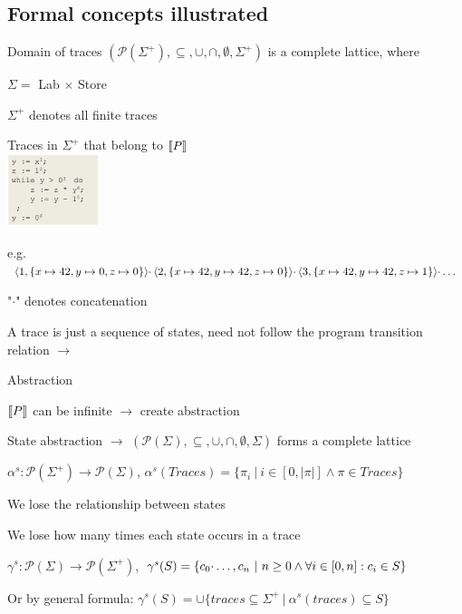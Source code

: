 \subsection{Formal concepts illustrated}
\enumstart
	\item Domain of traces $(\mathcal{P}(\Sigma^+), \subseteq, \cup, \cap, \emptyset, \Sigma^+)$ is a complete lattice, where
	\enumstart
		\item $\Sigma =$ Lab $\times$ Store
		\item $\Sigma^+$ denotes all finite traces
	\enumend
	\item Traces in $\Sigma^+$ that belong to $\llbracket P \rrbracket$
	\\ \includegraphics[width=0.2\textwidth]{img/sample_program.png}
	\enumstart
		\item e.g. $\langle 1, \{x \mapsto 42, y \mapsto 0, z \mapsto 0\} \rangle \cdotp \langle 2, \{x \mapsto 42, y \mapsto 42, z \mapsto 0\} \rangle \cdotp \langle 3, \{x \mapsto 42, y \mapsto 42, z \mapsto 1\} \rangle \cdotp \mathellipsis$
		\item "$\cdotp$" denotes concatenation
		\item A trace is just a sequence of states, need not follow the program transition relation $\rightarrow$
	\enumend
	\item Abstraction
	\enumstart
		\item $\llbracket P \rrbracket$ can be infinite $\rightarrow$ create abstraction
		\item State abstraction $\rightarrow$ $(\mathcal{P}(\Sigma), \subseteq, \cup, \cap, \emptyset, \Sigma)$ forms a complete lattice
		\enumstart
			\item $\alpha^s:  \mathcal{P}(\Sigma^+) \rightarrow \mathcal{P}(\Sigma)$, $\alpha^s(Traces) = \{\pi_i \ | \ i \in [0, |\pi|] \land \pi \in Traces\}$
			\item We lose the relationship between states
			\item We lose how many times each state occurs in a trace
			\item $\gamma^s: \mathcal{P}(\Sigma) \rightarrow \mathcal{P}(\Sigma^+)$, $\gamma^s(S) = \{c_0 \cdotp \mathellipsis, c_n \ | \ n \ge 0 \land \forall i \in [0, n]: c_i \in S\}$
			\item Or by general formula: $\gamma^s(S) = \cup \{traces \subseteq \Sigma^+ \ | \ \alpha^s(traces) \subseteq S\}$

